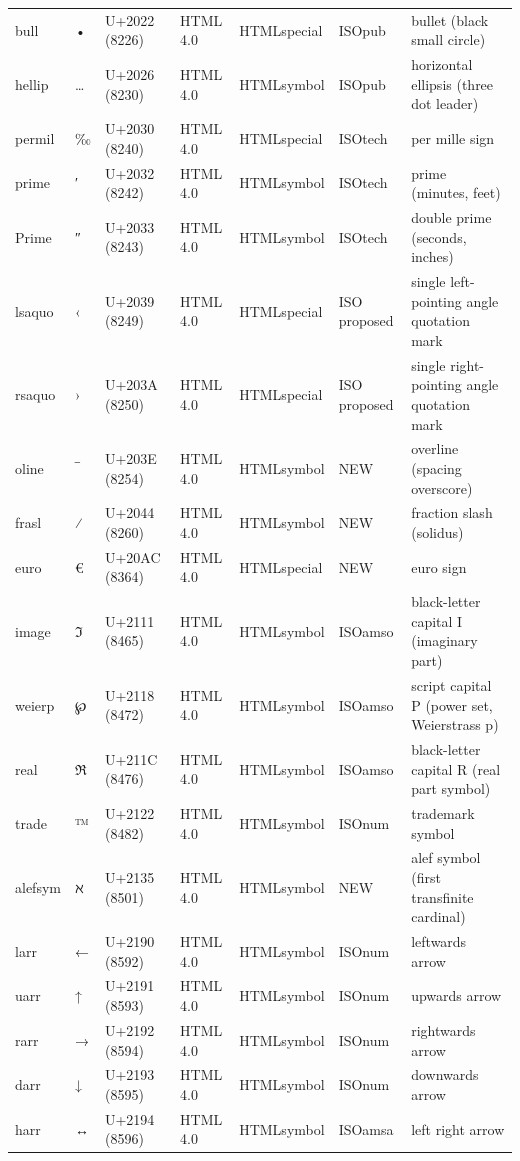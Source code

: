 \documentclass{article}
\begin{document}
\begin{tabular}{lllllll}
bull & • & U+2022 (8226) & HTML 4.0 & HTMLspecial & ISOpub & bullet (black small circle) \\
hellip & … & U+2026 (8230) & HTML 4.0 & HTMLsymbol & ISOpub & horizontal ellipsis (three dot leader) \\
permil & ‰ & U+2030 (8240) & HTML 4.0 & HTMLspecial & ISOtech & per mille sign \\
prime & ′ & U+2032 (8242) & HTML 4.0 & HTMLsymbol & ISOtech & prime (minutes, feet) \\
Prime & ″ & U+2033 (8243) & HTML 4.0 & HTMLsymbol & ISOtech & double prime (seconds, inches) \\
lsaquo & ‹ & U+2039 (8249) & HTML 4.0 & HTMLspecial & ISO proposed & single left-pointing angle quotation mark \\
rsaquo & › & U+203A (8250) & HTML 4.0 & HTMLspecial & ISO proposed & single right-pointing angle quotation mark \\
oline & ‾ & U+203E (8254) & HTML 4.0 & HTMLsymbol & NEW & overline (spacing overscore) \\
frasl & ⁄ & U+2044 (8260) & HTML 4.0 & HTMLsymbol & NEW & fraction slash (solidus) \\
euro & € & U+20AC (8364) & HTML 4.0 & HTMLspecial & NEW & euro sign \\
image & ℑ & U+2111 (8465) & HTML 4.0 & HTMLsymbol & ISOamso & black-letter capital I (imaginary part) \\
weierp & ℘ & U+2118 (8472) & HTML 4.0 & HTMLsymbol & ISOamso & script capital P (power set, Weierstrass p) \\
real & ℜ & U+211C (8476) & HTML 4.0 & HTMLsymbol & ISOamso & black-letter capital R (real part symbol) \\
trade & ™ & U+2122 (8482) & HTML 4.0 & HTMLsymbol & ISOnum & trademark symbol \\
alefsym & ℵ & U+2135 (8501) & HTML 4.0 & HTMLsymbol & NEW & alef symbol (first transfinite cardinal) \\
larr & ← & U+2190 (8592) & HTML 4.0 & HTMLsymbol & ISOnum & leftwards arrow \\
uarr & ↑ & U+2191 (8593) & HTML 4.0 & HTMLsymbol & ISOnum & upwards arrow \\
rarr & → & U+2192 (8594) & HTML 4.0 & HTMLsymbol & ISOnum & rightwards arrow \\
darr & ↓ & U+2193 (8595) & HTML 4.0 & HTMLsymbol & ISOnum & downwards arrow \\
harr & ↔ & U+2194 (8596) & HTML 4.0 & HTMLsymbol & ISOamsa & left right arrow \\

\end{tabular}
\end{document}
